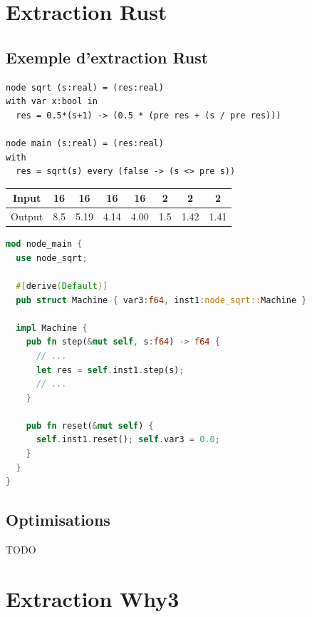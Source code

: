 \documentclass[11pt,usenames,dvipsnames]{beamer}
\begin{document}
\section{Extraction Rust}
\subsection{Exemple d'extraction Rust}

\begin{frame}[fragile]{\null}
  \begin{lstlisting}[language=minils]
node sqrt (s:real) = (res:real)
with var x:bool in
  res = 0.5*(s+1) -> (0.5 * (pre res + (s / pre res)))

node main (s:real) = (res:real)
with
  res = sqrt(s) every (false -> (s <> pre s))
  \end{lstlisting}

  \begin{tabular}{|c|ccccccc|}
    \hline
    Input  & 16   & 16   & 16   & 16   & 2   & 2    & 2   \\
    \hline
    Output & 8.5  & 5.19 & 4.14 & 4.00 & 1.5 & 1.42 & 1.41 \\
    \hline
\end{tabular}
\end{frame}

  \begin{frame}[fragile]{\null}
  \begin{lstlisting}[language=Rust]
mod node_main {
  use node_sqrt;

  #[derive(Default)]
  pub struct Machine { var3:f64, inst1:node_sqrt::Machine }

  impl Machine {
    pub fn step(&mut self, s:f64) -> f64 {
      // ...
      let res = self.inst1.step(s);
      // ...
    }

    pub fn reset(&mut self) {
      self.inst1.reset(); self.var3 = 0.0;
    }
  }
}
\end{lstlisting}
\end{frame}

\subsection{Optimisations}
\begin{frame}
  TODO
\end{frame}

\section{Extraction Why3}
\end{document}

